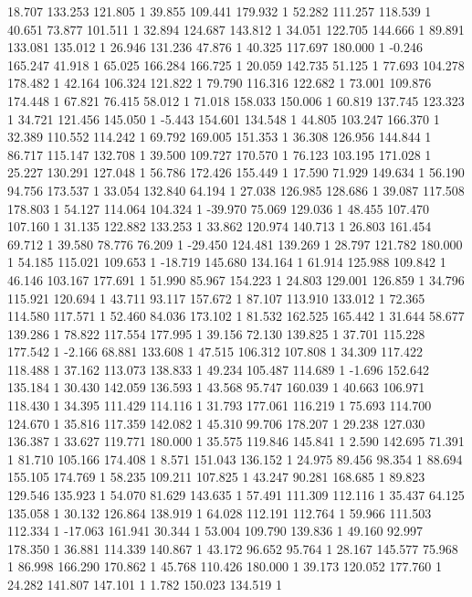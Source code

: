 	18.707 133.253 121.805 1
	39.855 109.441 179.932 1
	52.282 111.257 118.539 1
	40.651 73.877 101.511 1
	32.894 124.687 143.812 1
	34.051 122.705 144.666 1
	89.891 133.081 135.012 1
	26.946 131.236 47.876 1
	40.325 117.697 180.000 1
	-0.246 165.247 41.918 1
	65.025 166.284 166.725 1
	20.059 142.735 51.125 1
	77.693 104.278 178.482 1
	42.164 106.324 121.822 1
	79.790 116.316 122.682 1
	73.001 109.876 174.448 1
	67.821 76.415 58.012 1
	71.018 158.033 150.006 1
	60.819 137.745 123.323 1
	34.721 121.456 145.050 1
	-5.443 154.601 134.548 1
	44.805 103.247 166.370 1
	32.389 110.552 114.242 1
	69.792 169.005 151.353 1
	36.308 126.956 144.844 1
	86.717 115.147 132.708 1
	39.500 109.727 170.570 1
	76.123 103.195 171.028 1
	25.227 130.291 127.048 1
	56.786 172.426 155.449 1
	17.590 71.929 149.634 1
	56.190 94.756 173.537 1
	33.054 132.840 64.194 1
	27.038 126.985 128.686 1
	39.087 117.508 178.803 1
	54.127 114.064 104.324 1
	-39.970 75.069 129.036 1
	48.455 107.470 107.160 1
	31.135 122.882 133.253 1
	33.862 120.974 140.713 1
	26.803 161.454 69.712 1
	39.580 78.776 76.209 1
	-29.450 124.481 139.269 1
	28.797 121.782 180.000 1
	54.185 115.021 109.653 1
	-18.719 145.680 134.164 1
	61.914 125.988 109.842 1
	46.146 103.167 177.691 1
	51.990 85.967 154.223 1
	24.803 129.001 126.859 1
	34.796 115.921 120.694 1
	43.711 93.117 157.672 1
	87.107 113.910 133.012 1
	72.365 114.580 117.571 1
	52.460 84.036 173.102 1
	81.532 162.525 165.442 1
	31.644 58.677 139.286 1
	78.822 117.554 177.995 1
	39.156 72.130 139.825 1
	37.701 115.228 177.542 1
	-2.166 68.881 133.608 1
	47.515 106.312 107.808 1
	34.309 117.422 118.488 1
	37.162 113.073 138.833 1
	49.234 105.487 114.689 1
	-1.696 152.642 135.184 1
	30.430 142.059 136.593 1
	43.568 95.747 160.039 1
	40.663 106.971 118.430 1
	34.395 111.429 114.116 1
	31.793 177.061 116.219 1
	75.693 114.700 124.670 1
	35.816 117.359 142.082 1
	45.310 99.706 178.207 1
	29.238 127.030 136.387 1
	33.627 119.771 180.000 1
	35.575 119.846 145.841 1
	2.590 142.695 71.391 1
	81.710 105.166 174.408 1
	8.571 151.043 136.152 1
	24.975 89.456 98.354 1
	88.694 155.105 174.769 1
	58.235 109.211 107.825 1
	43.247 90.281 168.685 1
	89.823 129.546 135.923 1
	54.070 81.629 143.635 1
	57.491 111.309 112.116 1
	35.437 64.125 135.058 1
	30.132 126.864 138.919 1
	64.028 112.191 112.764 1
	59.966 111.503 112.334 1
	-17.063 161.941 30.344 1
	53.004 109.790 139.836 1
	49.160 92.997 178.350 1
	36.881 114.339 140.867 1
	43.172 96.652 95.764 1
	28.167 145.577 75.968 1
	86.998 166.290 170.862 1
	45.768 110.426 180.000 1
	39.173 120.052 177.760 1
	24.282 141.807 147.101 1
	1.782 150.023 134.519 1
